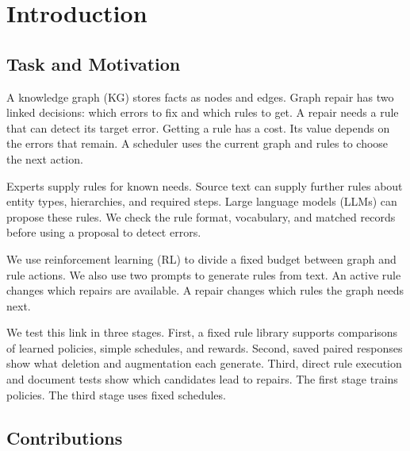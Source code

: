 \section{Introduction}

\label{sec:introduction}

\subsection{Task and Motivation}

A knowledge graph (KG) stores facts as nodes and edges. Graph repair has
two linked decisions: which errors to fix and which rules to get. A repair
needs a rule that can detect its target error. Getting a rule has a cost.
Its value depends on the errors that remain. A scheduler uses the current
graph and rules to choose the next action.

Experts supply rules for known needs. Source text can supply further rules
about entity types, hierarchies, and required steps. Large language models
(LLMs) can propose these rules. We check the rule format, vocabulary, and
matched records before using a proposal to detect errors.

We use reinforcement learning (RL) to divide a fixed budget between graph
and rule actions. We also use two prompts to generate rules from text.
An active rule changes which repairs are available. A repair changes which
rules the graph needs next.

We test this link in three stages. First, a fixed rule library supports
comparisons of learned policies, simple schedules, and rewards. Second,
saved paired responses show what deletion and augmentation each generate.
Third, direct rule execution and document tests show which candidates
lead to repairs. The first stage trains policies. The third stage uses
fixed schedules.

\subsection{Contributions}

